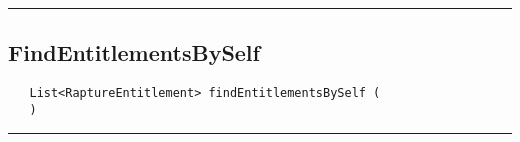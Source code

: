 \rule{15cm}{2pt}
\subsection{FindEntitlementsBySelf}
\label{Api:FindEntitlementsBySelf}
\begin{verbatim}
   List<RaptureEntitlement> findEntitlementsBySelf (
   )
\end{verbatim}



\rule{15cm}{2pt}
